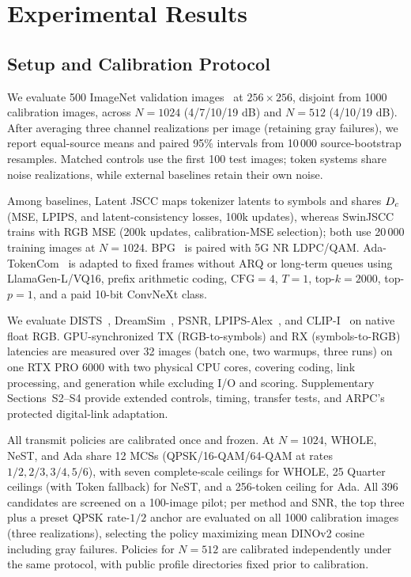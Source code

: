 \section{Experimental Results}
\ifCLASSOPTIONonecolumn\fi
\subsection{Setup and Calibration Protocol}
We evaluate 500 ImageNet validation images~\cite{imagenet} at $256\times256$, disjoint from 1000 calibration images, across $N=1024$ (4/7/10/19 dB) and $N=512$ (4/10/19 dB). After averaging three channel realizations per image (retaining gray failures), we report equal-source means and paired 95\% intervals from 10\,000 source-bootstrap resamples. Matched controls use the first 100 test images; token systems share noise realizations, while external baselines retain their own noise.

Among baselines, Latent JSCC maps tokenizer latents to symbols and shares $D_c$ (MSE, LPIPS, and latent-consistency losses, 100k updates), whereas SwinJSCC~\cite{swinjscc} trains with RGB MSE (200k updates, calibration-MSE selection); both use 20\,000 training images at $N=1024$. BPG~\cite{bpg} is paired with 5G NR LDPC/QAM. Ada-TokenCom~\cite{adatokencom} is adapted to fixed frames without ARQ or long-term queues using LlamaGen-L/VQ16, prefix arithmetic coding, $\mathrm{CFG}=4$, $T=1$, top-$k=2000$, top-$p=1$, and a paid 10-bit ConvNeXt class.

We evaluate DISTS~\cite{dists}, DreamSim~\cite{dreamsim}, PSNR, LPIPS-Alex~\cite{lpips}, and CLIP-I~\cite{clip} on native float RGB. GPU-synchronized TX (RGB-to-symbols) and RX (symbols-to-RGB) latencies are measured over 32 images (batch one, two warmups, three runs) on one RTX PRO 6000 with two physical CPU cores, covering coding, link processing, and generation while excluding I/O and scoring. Supplementary Sections~S2--S4 provide extended controls, timing, transfer tests, and ARPC's protected digital-link adaptation.

All transmit policies are calibrated once and frozen. At $N=1024$, WHOLE, NeST, and Ada share 12 MCSs (QPSK/16-QAM/64-QAM at rates $1/2, 2/3, 3/4, 5/6$), with seven complete-scale ceilings for WHOLE, 25 Quarter ceilings (with Token fallback) for NeST, and a 256-token ceiling for Ada. All 396 candidates are screened on a 100-image pilot; per method and SNR, the top three plus a preset QPSK rate-$1/2$ anchor are evaluated on all 1000 calibration images (three realizations), selecting the policy maximizing mean DINOv2 cosine~\cite{dinov2} including gray failures. Policies for $N=512$ are calibrated independently under the same protocol, with public profile directories fixed prior to calibration.

